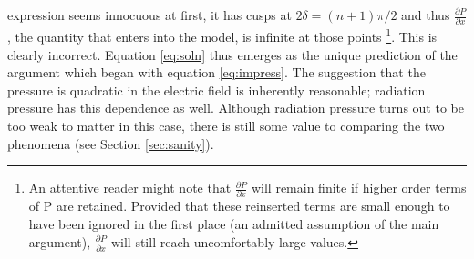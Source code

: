 \documentclass[twocolumn,showpacs,preprintnumbers,amsmath,amssymb]{revtex4}
\begin{document}
expression seems innocuous at first, it has cusps at $2\delta=(n+1)\pi/2$ and thus
$\frac{\partial P}{\partial x}$, the quantity that enters into the model, is infinite at
those points \footnote{ An attentive reader might note that $\frac{\partial P}{\partial
x}$ will remain finite if higher order terms of P are retained. Provided that these
reinserted terms are small enough to have been ignored in the first place (an admitted
assumption of the main argument), $\frac{\partial P}{\partial x}$ will still reach
uncomfortably large values. }.
This is clearly incorrect. Equation \ref{eq:soln} thus
emerges as the unique prediction of the argument which began with equation
\ref{eq:impress}. The suggestion that the pressure is quadratic in the electric field is
inherently reasonable; radiation pressure has this dependence as well. Although radiation
pressure turns out to be too weak to matter in this case, there is still some value to
comparing the two phenomena (see Section \ref{sec:sanity}).
\end{document}
